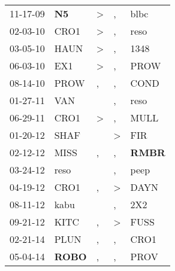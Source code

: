 \begin{supertabular}{p{0.07\textwidth}p{0.06\textwidth}p{0.02\textwidth}p{0.02\textwidth}p{0.06\textwidth}}
          11-17-09\textsuperscript{} &    \textbf{N5\textsuperscript{}} &     \textgreater &             , &           blbc\textsuperscript{} \\
          02-03-10\textsuperscript{} &           CRO1\textsuperscript{} &     \textgreater &             , &           reso\textsuperscript{} \\
          03-05-10\textsuperscript{} &           HAUN\textsuperscript{} &     \textgreater &             , &           1348\textsuperscript{} \\
          06-03-10\textsuperscript{} &            EX1\textsuperscript{} &     \textgreater &             , &           PROW\textsuperscript{} \\
          08-14-10\textsuperscript{} &           PROW\textsuperscript{} &                , &             , &           COND\textsuperscript{} \\
          01-27-11\textsuperscript{} &            VAN\textsuperscript{} &                  &             , &           reso\textsuperscript{} \\
          06-29-11\textsuperscript{} &           CRO1\textsuperscript{} &     \textgreater &             , &           MULL\textsuperscript{} \\
          01-20-12\textsuperscript{} &           SHAF\textsuperscript{} &                  &  \textgreater &            FIR\textsuperscript{} \\
          02-12-12\textsuperscript{} &           MISS\textsuperscript{} &                , &             , &  \textbf{RMBR\textsuperscript{}} \\
          03-24-12\textsuperscript{} &           reso\textsuperscript{} &                  &             , &           peep\textsuperscript{} \\
          04-19-12\textsuperscript{} &           CRO1\textsuperscript{} &                , &  \textgreater &           DAYN\textsuperscript{} \\
          08-11-12\textsuperscript{} &           kabu\textsuperscript{} &                  &             , &            2X2\textsuperscript{} \\
          09-21-12\textsuperscript{} &           KITC\textsuperscript{} &                , &  \textgreater &           FUSS\textsuperscript{} \\
          02-21-14\textsuperscript{} &           PLUN\textsuperscript{} &                , &             , &           CRO1\textsuperscript{} \\
          05-04-14\textsuperscript{} &  \textbf{ROBO\textsuperscript{}} &                , &             , &           PROV\textsuperscript{} \\

\end{supertabular}
